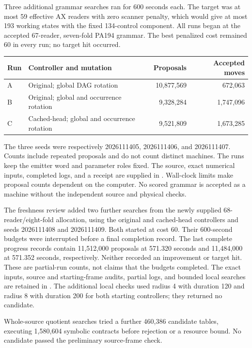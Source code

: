 Three additional grammar searches ran for 600 seconds each. The target
was at most 59 effective AX readers with zero scanner penalty, which
would give at most 193 working states with the fixed 134-control component.
All runs began at the accepted 67-reader, seven-fold PA194 grammar.
The best penalized cost remained 60 in every run; no target hit occurred.

\begin{center}
\begin{tabular}{@{}llrr@{}}
\toprule
Run & Controller and mutation & Proposals & Accepted moves\\
\midrule
A & Original; global DAG rotation &10,877,569&672,063\\
B & Original; global and occurrence rotation &9,328,284&1,747,096\\
C & Cached-head; global and occurrence rotation &9,521,809&1,673,285\\
\bottomrule
\end{tabular}
\end{center}

The three seeds were respectively 2026111405, 2026111406, and 2026111407.
Counts include repeated proposals and do not count distinct machines.
The runs keep the emitter word and parameter roles fixed. The source,
exact numerical inputs, completed logs, and a receipt are supplied in
. Wall-clock limits make proposal counts dependent
on the computer. No scored grammar is accepted as a machine without the
independent source and physical checks.

The freshness review added two further searches from the newly supplied
68-reader/eight-fold allocation, using the original and cached-head
controllers and seeds 2026111408 and 2026111409. Both started at cost 60.
Their 600-second budgets were interrupted before a final completion
record. The last complete progress records contain 11,512,000 proposals
at 571.320 seconds and 11,484,000 at 571.352 seconds, respectively.
Neither recorded an improvement or target hit. These are partial-run
counts, not claims that the budgets completed. The exact inputs, source
and starting-frame audits, partial logs, and bounded local searches are
retained in . The additional local
checks used radius 4 with duration 120 and radius 8 with duration 200
for both starting controllers; they returned no candidate.

Whole-source quotient searches tried a further 460,386 candidate tables,
executing 1,580,604 symbolic contracts before rejection or a resource bound.
No candidate passed the preliminary source-frame check.

